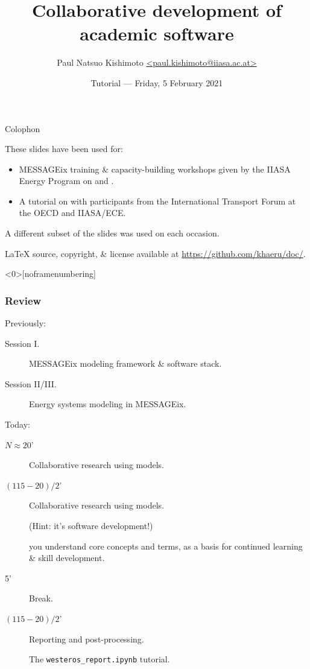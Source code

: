 \documentclass[12pt,aspectratio=169]{beamer}
\title{Collaborative development of academic software}
\institute{IIASA Energy, Climate, and Environment program}
\date{Tutorial — Friday, 5 February 2021}
\author{\texorpdfstring{Paul Natsuo Kishimoto \scriptsize\newline
  \href{mailto:paul.kishimoto@iiasa.ac.at}%
       {\ttfamily <paul.kishimoto@iiasa.ac.at>}}%
  {Paul Natsuo Kishimoto <paul.kishimoto@iiasa.ac.at>}}
\begin{document}
\maketitle

\begin{frame}{Colophon}

These slides have been used for:
\begin{itemize}
  \item MESSAGEix training \& capacity-building workshops given by the IIASA Energy Program on  and .

  \item A tutorial on  with participants from the International Transport Forum at the OECD and IIASA/ECE.
\end{itemize}

\medskip
A different subset of the slides was used on each occasion.

\medskip
LaTeX source, copyright, \& license available at \url{https://github.com/khaeru/doc/}.

\end{frame}

\begin{frame}<0>[noframenumbering]  %
\frametitle{Review}

Previously:
\begin{description}
  \item [Session I.] MESSAGEix modeling framework \& software stack.
  \item [Session II/III.] Energy systems modeling in MESSAGEix.
\end{description}

\bigskip
Today:
\begin{description}
  \item [$N \approx 20$'] Collaborative research using models.


  \item [$(115 - 20) / 2$'] Collaborative research using models.

  (Hint: it's software development!)

   you understand core concepts and terms, as a basis for continued learning \& skill development.

  \item [5'] Break.

  \item [$(115 - 20) / 2$'] Reporting and post-processing.

  The \texttt{westeros\_report.ipynb} tutorial.
\end{description}

\end{frame}
\end{document}

